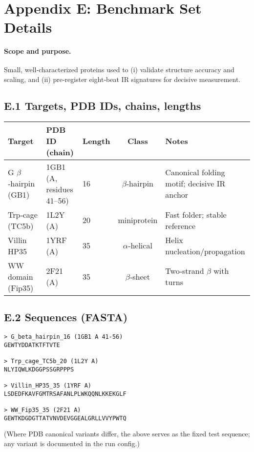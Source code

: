 \documentclass[12pt,a4paper]{article}
\begin{document}
\section*{Appendix E: Benchmark Set Details}

\paragraph{Scope and purpose.}
Small, well‑characterized proteins used to (i) validate structure accuracy and scaling, and (ii) pre‑register eight‑beat IR signatures for decisive measurement.

\subsection*{E.1 Targets, PDB IDs, chains, lengths}
\begin{center}
\renewcommand{\arraystretch}{1.15}
\begin{tabular}{@{}lllc l@{}}
\toprule
Target & PDB ID (chain) & Length & Class & Notes \\
\midrule
G $\beta$‑hairpin (GB1) & 1GB1 (A, residues 41–56) & 16 & $\beta$‑hairpin & Canonical folding motif; decisive IR anchor \\
Trp‑cage (TC5b) & 1L2Y (A) & 20 & miniprotein & Fast folder; stable reference \\
Villin HP35 & 1YRF (A) & 35 & $\alpha$‑helical & Helix nucleation/propagation \\
WW domain (Fip35) & 2F21 (A) & 35 & $\beta$‑sheet & Two‑strand $\beta$ with turns \\
\bottomrule
\end{tabular}
\end{center}

\subsection*{E.2 Sequences (FASTA)}
\begin{verbatim}
> G_beta_hairpin_16 (1GB1 A 41-56)
GEWTYDDATKTFTVTE

> Trp_cage_TC5b_20 (1L2Y A)
NLYIQWLKDGGPSSGRPPPS

> Villin_HP35_35 (1YRF A)
LSDEDFKAVFGMTRSAFANLPLWKQQNLKKEKGLF

> WW_Fip35_35 (2F21 A)
GEWTKDGDGTTATVNVDEVGGEALGRLLVVYPWTQ
\end{verbatim}
(Where PDB canonical variants differ, the above serves as the fixed test sequence; any variant is documented in the run config.)
\end{document}
